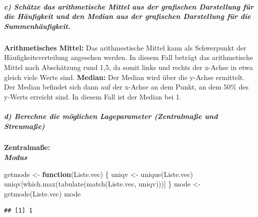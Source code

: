 \documentclass[
]{article}
\newenvironment{Shaded}{\begin{snugshade}}{\end{snugshade}}
\newcommand{\ControlFlowTok}[1]{\textcolor[rgb]{0.13,0.29,0.53}{\textbf{#1}}}
\newcommand{\FunctionTok}[1]{\textcolor[rgb]{0.00,0.00,0.00}{#1}}
\newcommand{\NormalTok}[1]{#1}
\newcommand{\OtherTok}[1]{\textcolor[rgb]{0.56,0.35,0.01}{#1}}
\begin{document}
\hypertarget{c-schuxe4tze-das-arithmetische-mittel-aus-der-grafischen-darstellung-fuxfcr-die-huxe4ufigkeit-und-den-median-aus-der-grafischen-darstellung-fuxfcr-die-summenhuxe4ufigkeit.}{%
\subparagraph{\texorpdfstring{\textbf{c) Schätze das arithmetische
Mittel aus der grafischen Darstellung für die Häufigkeit und den Median
aus der grafischen Darstellung für die
Summenhäufigkeit.}}{c) Schätze das arithmetische Mittel aus der grafischen Darstellung für die Häufigkeit und den Median aus der grafischen Darstellung für die Summenhäufigkeit.}}\label{c-schuxe4tze-das-arithmetische-mittel-aus-der-grafischen-darstellung-fuxfcr-die-huxe4ufigkeit-und-den-median-aus-der-grafischen-darstellung-fuxfcr-die-summenhuxe4ufigkeit.}}

\textbf{Arithmetisches Mittel:} Das arithmestische Mittel kann als
Schwerpunkt der Häufigkeitsverteilung angesehen werden. In diesem Fall
beträgt das arithmetische Mittel nach Abschätzung rund 1,5, da somit
links und rechts der x-Achse in etwa gleich viele Werte sind.
\textbf{Median:} Der Median wird über die y-Achse ermittelt. Der Median
befindet sich dann auf der x-Achse an dem Punkt, an dem 50\% des y-Werts
erreicht sind. In diesem Fall ist der Median bei 1.

\hypertarget{d-berechne-die-muxf6glichen-lageparameter-zentralmauxdfe-und-streumauxdfe}{%
\subparagraph{\texorpdfstring{\textbf{d) Berechne die möglichen
Lageparameter (Zentralmaße und
Streumaße)}}{d) Berechne die möglichen Lageparameter (Zentralmaße und Streumaße)}}\label{d-berechne-die-muxf6glichen-lageparameter-zentralmauxdfe-und-streumauxdfe}}

\textbf{Zentralmaße:}\\
\textbf{\emph{Modus}}

\begin{Shaded}
\begin{Highlighting}[]
\NormalTok{getmode }\OtherTok{\textless{}{-}} \ControlFlowTok{function}\NormalTok{(Liste.vec) \{}
\NormalTok{   uniqv }\OtherTok{\textless{}{-}} \FunctionTok{unique}\NormalTok{(Liste.vec)}
\NormalTok{   uniqv[}\FunctionTok{which.max}\NormalTok{(}\FunctionTok{tabulate}\NormalTok{(}\FunctionTok{match}\NormalTok{(Liste.vec, uniqv)))]}
\NormalTok{\}}
\NormalTok{mode }\OtherTok{\textless{}{-}} \FunctionTok{getmode}\NormalTok{(Liste.vec)}
\NormalTok{mode}
\end{Highlighting}
\end{Shaded}

\begin{verbatim}
## [1] 1
\end{verbatim}
\end{document}
